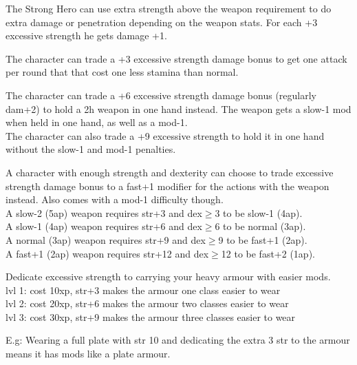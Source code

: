  The Strong Hero can use extra strength above the weapon requirement to do extra damage or penetration depending on the weapon stats. For each +3 excessive strength he gets damage +1.


 The character can trade a +3 excessive strength damage bonus to get one attack per round that that cost one less stamina than normal.


 The character can trade a +6 excessive strength damage bonus (regularly dam+2) to hold a 2h weapon in one hand instead. The weapon gets a slow-1 mod when held in one hand, as well as a mod-1. \\
The character can also trade a +9 excessive strength to hold it in one hand without the slow-1 and mod-1 penalties.


 A character with enough strength and dexterity can choose to trade excessive strength damage bonus to a fast+1 modifier for the actions with the weapon instead. Also comes with a mod-1 difficulty though. \\
A slow-2 (5ap) weapon requires str+3 and dex$\geq$3 to be slow-1 (4ap).\\
A slow-1 (4ap) weapon requires str+6 and dex$\geq$6 to be normal (3ap).\\
A normal (3ap) weapon requires str+9 and dex$\geq$9 to be fast+1 (2ap).\\
A fast+1 (2ap) weapon requires str+12 and dex$\geq$12 to be fast+2 (1ap).




Dedicate excessive strength to carrying your heavy armour with easier mods.\\
lvl 1: cost 10xp, str+3 makes the armour one class easier to wear\\
lvl 2: cost 20xp, str+6 makes the armour two classes easier to wear\\
lvl 3: cost 30xp, str+9 makes the armour three classes easier to wear

E.g: Wearing a full plate with str 10 and dedicating the extra 3 str to the armour means it has mods like a plate armour.

